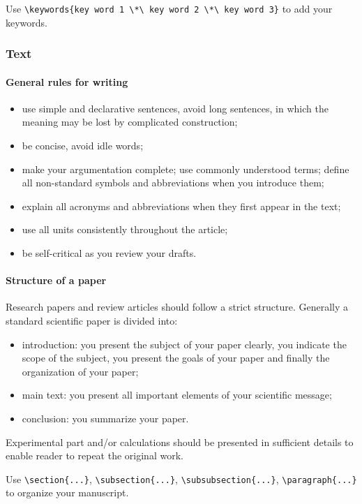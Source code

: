 \documentclass{lpaper} %
\begin{document}
Use {\tt \verb+\keywords{key word 1 \*\ key word 2 \*\ key word 3}+} to add your keywords.


\subsubsection{Text}

\paragraph{General rules for writing}
\begin{itemize}
\item use simple and declarative sentences, avoid long sentences, in which the meaning may be lost by complicated construction;
\item be concise, avoid idle words;
\item make your argumentation complete; use commonly understood terms; define all non-standard symbols and abbreviations when you introduce them;
\item explain all acronyms and abbreviations when they first appear in the text;
\item use all units consistently throughout the article;
\item be self-critical as you review your drafts.
\end{itemize}

\paragraph{Structure of a paper}
    Research papers and review articles should follow a strict structure. Generally a standard scientific paper is divided into:
\begin{itemize}
\item introduction: you present the subject of your paper clearly, you indicate the scope of the subject, you present the goals of your paper and finally the organization of your paper;
\item main text: you present all important elements of your scientific message;
\item conclusion: you summarize your paper.
\end{itemize}


    Experimental part and/or calculations should be presented in sufficient details to enable reader to repeat the original work.


Use
\verb+\section{...}+,
\verb+\subsection{...}+,
\verb+\subsubsection{...}+,
\verb+\paragraph{...}+
to organize your manuscript.
\end{document}
